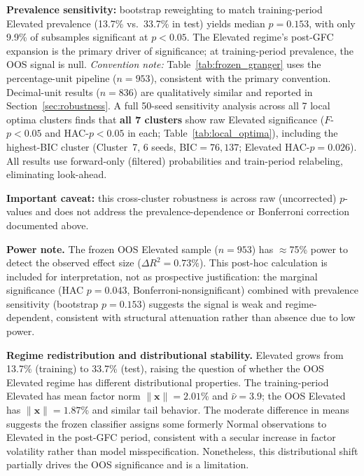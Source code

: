 \documentclass[sigconf,anonymous]{acmart}
\begin{document}
\textbf{Prevalence sensitivity:} bootstrap reweighting to match training-period
Elevated prevalence (13.7\% vs.\ 33.7\% in test) yields median $p = 0.153$,
with only 9.9\% of subsamples significant at $p < 0.05$.
The Elevated regime's post-GFC expansion is the primary driver of significance;
at training-period prevalence, the OOS signal is null.
\emph{Convention note:} Table~\ref{tab:frozen_granger} uses the percentage-unit
pipeline ($n = 953$), consistent with the primary convention.
Decimal-unit results ($n = 836$) are qualitatively similar and reported in
Section~\ref{sec:robustness}.
A full 50-seed sensitivity analysis across all 7 local optima clusters finds that
\textbf{all 7 clusters} show raw Elevated significance ($F$-$p < 0.05$ and HAC-$p < 0.05$
in each; Table~\ref{tab:local_optima}), including the highest-BIC cluster
(Cluster~7, 6 seeds, BIC$= 76{,}137$; Elevated HAC-$p = 0.026$).
All results use forward-only (filtered) probabilities and train-period relabeling,
eliminating look-ahead.

\textbf{Important caveat:} this cross-cluster robustness is across raw
(uncorrected) $p$-values and does not address the prevalence-dependence
or Bonferroni correction documented above.

\textbf{Power note.} The frozen OOS Elevated sample ($n = 953$) has
$\approx$75\% power to detect the observed effect size
($\Delta R^2 = 0.73\%$). This post-hoc calculation is included for
interpretation, not as prospective justification: the marginal
significance (HAC $p = 0.043$, Bonferroni-nonsignificant) combined
with prevalence sensitivity (bootstrap $p = 0.153$) suggests the
signal is weak and regime-dependent, consistent with structural
attenuation rather than absence due to low power.

\textbf{Regime redistribution and distributional stability.}
Elevated grows from 13.7\% (training) to 33.7\% (test), raising the question
of whether the OOS Elevated regime has different distributional properties.
The training-period Elevated has mean factor norm $\|\mathbf{x}\| = 2.01$\% and
$\hat{\nu} = 3.9$; the OOS Elevated has $\|\mathbf{x}\| = 1.87$\% and similar
tail behavior. The moderate difference in means suggests the frozen classifier
assigns some formerly Normal observations to Elevated in the post-GFC period,
consistent with a secular increase in factor volatility rather than model
misspecification. Nonetheless, this distributional shift partially drives the OOS
significance and is a limitation.
\end{document}
